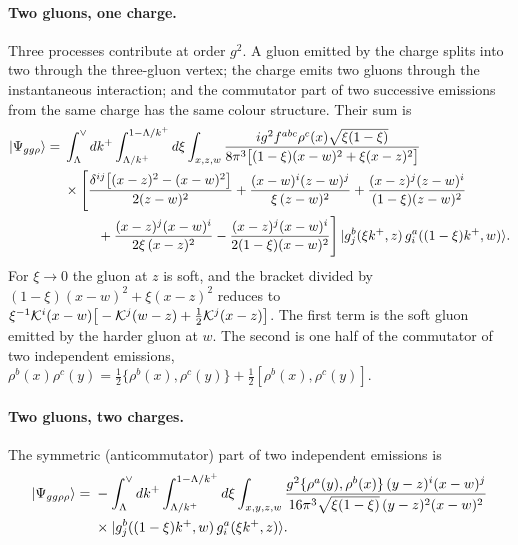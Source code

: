 \paragraph*{Two gluons, one charge.} Three processes contribute at order $g^2$. A gluon emitted by the charge splits into two through the three-gluon vertex; the charge emits two gluons through the instantaneous interaction; and the commutator part of two successive emissions from the same charge has the same colour structure. Their sum is
\begin{align}
|\Psi_{gg\rho}\rangle={}&\int_{\Lambda}^{\vee}dk^+\int_{\Lambda/k^+}^{1-\Lambda/k^+}d\xi\int_{x,z,w}\frac{ig^2f^{abc}\rho^c(x)\sqrt{\xi(1-\xi)}}{8\pi^3\big[(1-\xi)(x-w)^2+\xi(x-z)^2\big]}\notag\\
&\times\Bigg[\frac{\delta^{ij}\big[(x-z)^2-(x-w)^2\big]}{2(z-w)^2}+\frac{(x-w)^i(z-w)^j}{\xi\,(z-w)^2}+\frac{(x-z)^j(z-w)^i}{(1-\xi)(z-w)^2}\notag\\
&\hspace{2.5em}+\frac{(x-z)^j(x-w)^i}{2\xi\,(x-z)^2}-\frac{(x-z)^j(x-w)^i}{2(1-\xi)(x-w)^2}\Bigg]\,|g^b_j(\xi k^+,z)\,g^a_i((1-\xi)k^+,w)\rangle .
\label{eq:ggrho}
\end{align}
For $\xi\to0$ the gluon at $z$ is soft, and the bracket divided by $(1-\xi)(x-w)^2+\xi(x-z)^2$ reduces to $\xi^{-1}\mathcal{K}^i(x-w)\big[-\mathcal{K}^j(w-z)+\tfrac12\mathcal{K}^j(x-z)\big]$. The first term is the soft gluon emitted by the harder gluon at $w$. The second is one half of the commutator of two independent emissions, $\rho^b(x)\rho^c(y)=\frac12\{\rho^b(x),\rho^c(y)\}+\frac12[\rho^b(x),\rho^c(y)]$.

\paragraph*{Two gluons, two charges.} The symmetric (anticommutator) part of two independent emissions is
\begin{align}
|\Psi_{gg\rho\rho}\rangle={}&-\int_{\Lambda}^{\vee}dk^+\int_{\Lambda/k^+}^{1-\Lambda/k^+}d\xi\int_{x,y,z,w}\frac{g^2\{\rho^a(y),\rho^b(x)\}\,(y-z)^i(x-w)^j}{16\pi^3\sqrt{\xi(1-\xi)}\,(y-z)^2(x-w)^2}\notag\\
&\times|g^b_j((1-\xi)k^+,w)\,g^a_i(\xi k^+,z)\rangle .
\label{eq:ggrhorho}
\end{align}

